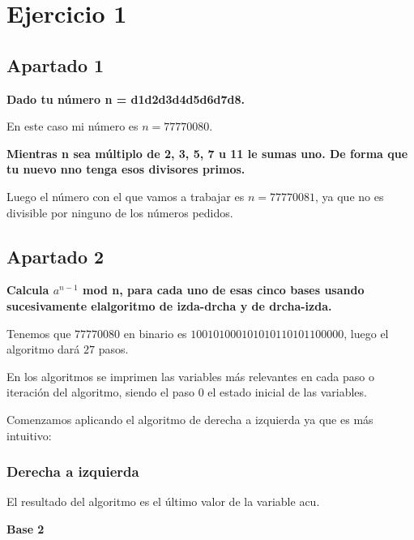 \documentclass[a4paper]{article}
\title {\fbox{\Huge{\textbf{Ejercicio 1}}}}
\author {\fbox{Ana Buendía Ruiz-Azuaga}}
\begin{document}
\maketitle


\section{Ejercicio 1}
\subsection{Apartado 1}
\textbf{Dado tu número n = d1d2d3d4d5d6d7d8.}

En este caso mi número es $n=77770080$.

\textbf{Mientras n sea múltiplo de 2, 3, 5, 7 u 11 le sumas uno. De forma que tu nuevo nno tenga esos divisores primos.}

Luego el número con el que vamos a trabajar es $n=77770081$, ya que no es divisible por ninguno de los números pedidos.

\subsection{Apartado 2}
\textbf{Calcula $a^{n-1}$ mod n, para cada uno de esas cinco bases usando sucesivamente elalgoritmo de izda-drcha y de drcha-izda.}

Tenemos que $77770080$ en binario es $100101000101010110101100000$, luego el algoritmo dará $27$ pasos.

En los algoritmos se imprimen las variables más relevantes en cada paso o iteración del algoritmo, siendo el paso 0 el estado inicial de las variables.

Comenzamos aplicando el algoritmo de derecha a izquierda ya que es más intuitivo:

\subsubsection{Derecha a izquierda}

El resultado del algoritmo es el último valor de la variable acu.

\textbf{Base 2}
\end{document}
